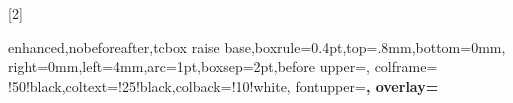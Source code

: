 \newcommand{\xpComp}[2]{
\cpbox{#1}{#2} {\textbf{#1}}}



\newtcbox{\cpbox}[2]{enhanced,nobeforeafter,tcbox raise base,boxrule=0.4pt,top=.8mm,bottom=0mm,
  right=0mm,left=4mm,arc=1pt,boxsep=2pt,before upper={\vphantom{dlg}},
  colframe= !50!black,coltext=!25!black,colback=!10!white,
  fontupper=\sffamily\bfseries,
  overlay={}}


\newcommand{\progress}[1]{
    \begin{tikzpicture}
        \fill[bleuxpc, rounded corners =1 mm] (0,0) rectangle (#1/100*2.5,.4);
         \draw[bleuxp,thick, rounded corners =1 mm] (0,0) rectangle (2.5,.4);
         \node at (1.25,0.2) {\textcolor{black}{#1~\%}};
    \end{tikzpicture}
}

